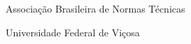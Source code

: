 \listoffigures*
\cleardoublepage

\listoftables*
\cleardoublepage

\begin{siglas}
    \item[ABNT] Associação Brasileira de Normas Técnicas
    \item[UFV] Universidade Federal de Viçosa
\end{siglas}
\cleardoublepage

\tableofcontents*
\cleardoublepage

\textual
\ifcompleta\else
    \pagestyle{abntheadings}
    \setcounter{page}{\primeirapaginadocorpo}
\fi





\postextual


\begin{apendicesenv}
    \partapendices
    
\end{apendicesenv}


